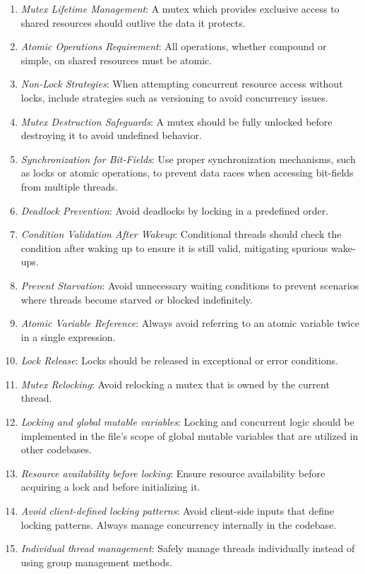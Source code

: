 \documentclass[9pt]{IEEEtran} %
\begin{document}
\begin{enumerate}
  \item \textit{Mutex Lifetime Management}: A mutex which provides exclusive access to shared resources should outlive the data it protects.
  \item \textit{Atomic Operations Requirement}: All operations, whether compound or simple, on shared resources must be atomic. 
  \item \textit{Non-Lock Strategies}: When attempting concurrent resource access without locks, include strategies such as versioning to avoid concurrency issues.
  \item \textit{Mutex Destruction Safeguards}: A mutex should be fully unlocked before destroying it to avoid undefined behavior.
  \item \textit{Synchronization for Bit-Fields}: Use proper synchronization mechanisms, such as locks or atomic operations, to prevent data races when accessing bit-fields from multiple threads.
  \item \textit{Deadlock Prevention}: Avoid deadlocks by locking in a predefined order.
  \item \textit{Condition Validation After Wakeup}: Conditional threads should check the condition after waking up to ensure it is still valid, mitigating spurious wake-ups.
  \item \textit{Prevent Starvation}: Avoid unnecessary waiting conditions to prevent scenarios where threads become starved or blocked indefinitely.
  \item \textit{Atomic Variable Reference}: Always avoid referring to an atomic variable twice in a single expression.
  \item \textit{Lock Release}: Locks should be released in exceptional or error conditions.
  \item \textit{Mutex Relocking}: Avoid relocking a mutex that is owned by the current thread.
  \item \textit{Locking and global mutable variables}: Locking and concurrent logic should be implemented in the file's scope of global mutable variables that are utilized in other codebases.
  \item \textit{Resource availability before locking}: Ensure resource availability before acquiring a lock and before initializing it.
  \item \textit{Avoid client-defined locking patterns}: Avoid client-side inputs that define locking patterns. Always manage concurrency internally in the codebase.
  \item \textit{Individual thread management}: Safely manage threads individually instead of using group management methods.

\end{enumerate}
\end{document}
